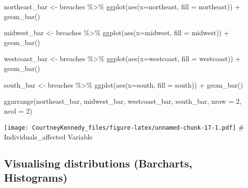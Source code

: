 \documentclass[
]{article}
\newenvironment{Shaded}{\begin{snugshade}}{\end{snugshade}}
\newcommand{\AttributeTok}[1]{\textcolor[rgb]{0.77,0.63,0.00}{#1}}
\newcommand{\DecValTok}[1]{\textcolor[rgb]{0.00,0.00,0.81}{#1}}
\newcommand{\FunctionTok}[1]{\textcolor[rgb]{0.00,0.00,0.00}{#1}}
\newcommand{\NormalTok}[1]{#1}
\newcommand{\OtherTok}[1]{\textcolor[rgb]{0.56,0.35,0.01}{#1}}
\newcommand{\SpecialCharTok}[1]{\textcolor[rgb]{0.00,0.00,0.00}{#1}}
\begin{document}
\begin{Shaded}
\begin{Highlighting}[]
\NormalTok{northeast\_bar }\OtherTok{\textless{}{-}} 
\NormalTok{breaches }\SpecialCharTok{\%\textgreater{}\%}
  \FunctionTok{ggplot}\NormalTok{(}\FunctionTok{aes}\NormalTok{(}\AttributeTok{x=}\NormalTok{northeast, }\AttributeTok{fill =}\NormalTok{ northeast)) }\SpecialCharTok{+}
  \FunctionTok{geom\_bar}\NormalTok{()}

\NormalTok{midwest\_bar }\OtherTok{\textless{}{-}} 
\NormalTok{breaches }\SpecialCharTok{\%\textgreater{}\%}
  \FunctionTok{ggplot}\NormalTok{(}\FunctionTok{aes}\NormalTok{(}\AttributeTok{x=}\NormalTok{midwest, }\AttributeTok{fill =}\NormalTok{ midwest)) }\SpecialCharTok{+}
  \FunctionTok{geom\_bar}\NormalTok{()}

\NormalTok{westcoast\_bar }\OtherTok{\textless{}{-}} 
\NormalTok{breaches }\SpecialCharTok{\%\textgreater{}\%}
  \FunctionTok{ggplot}\NormalTok{(}\FunctionTok{aes}\NormalTok{(}\AttributeTok{x=}\NormalTok{westcoast, }\AttributeTok{fill =}\NormalTok{ westcoast)) }\SpecialCharTok{+}
  \FunctionTok{geom\_bar}\NormalTok{()}

\NormalTok{south\_bar }\OtherTok{\textless{}{-}} 
\NormalTok{breaches }\SpecialCharTok{\%\textgreater{}\%}
  \FunctionTok{ggplot}\NormalTok{(}\FunctionTok{aes}\NormalTok{(}\AttributeTok{x=}\NormalTok{south, }\AttributeTok{fill =}\NormalTok{ south)) }\SpecialCharTok{+}
  \FunctionTok{geom\_bar}\NormalTok{()}

\FunctionTok{ggarrange}\NormalTok{(northeast\_bar, midwest\_bar, westcoast\_bar, south\_bar, }\AttributeTok{nrow =} \DecValTok{2}\NormalTok{, }\AttributeTok{ncol =} \DecValTok{2}\NormalTok{)}
\end{Highlighting}
\end{Shaded}

\texttt{[image: CourtneyKennedy\_files/figure-latex/unnamed-chunk-17-1.pdf]}
\# Individuals\_affected Variable

\hypertarget{visualising-distributions-barcharts-histograms}{%
\subsection{Visualising distributions (Barcharts,
Histograms)}\label{visualising-distributions-barcharts-histograms}}
\end{document}
